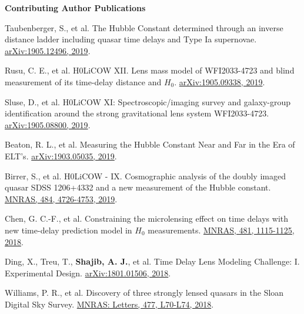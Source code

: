 \documentclass[margin, line]{res}
\begin{document}
\begin{resume}
\textbf{Contributing Author Publications} \\
\begin{etaremune}
	\item Taubenberger, S., et al. The Hubble Constant determined through an inverse distance ladder including quasar time delays and Type Ia supernovae. \href{https://arxiv.org/abs/1905.12496}{arXiv:1905.12496, 2019}.
	\item Rusu, C. E., et al. H0LiCOW XII. Lens mass model of WFI2033-4723 and blind measurement of its time-delay distance and $H_0$. \href{http://adsabs.harvard.edu/abs/2019arXiv190509338R}{arXiv:1905.09338, 2019}.
	\item Sluse, D., et al. H0LiCOW XI: Spectroscopic/imaging survey and galaxy-group identification around the strong gravitational lens system WFI2033-4723. \href{http://adsabs.harvard.edu/abs/2019arXiv190508800S}{arXiv:1905.08800, 2019}.
	\item Beaton, R. L., et al. Measuring the Hubble Constant Near and Far in the Era of ELT's. \href{https://arxiv.org/abs/1903.05035}{arXiv:1903.05035, 2019}.
	\item Birrer, S., et al. H0LiCOW - IX. Cosmographic analysis of the doubly imaged quasar SDSS 1206+4332 and a new measurement of the Hubble constant. \href{https://doi.org/10.1093/mnras/stz200}{MNRAS, 484, 4726-4753, 2019}.
	\item Chen, G. C.-F., et al. Constraining the microlensing effect on time delays with new time-delay prediction model in $H_0$ measurements. \href{https://doi.org/10.1093/mnras/sty2350}{MNRAS, 481, 1115-1125, 2018}.
	\item Ding, X., Treu, T., {\bf Shajib, A. J.}, et al. Time Delay Lens Modeling Challenge: I. Experimental Design. \href{https://arxiv.org/abs/1801.01506}{arXiv:1801.01506, 2018}.
 	\item Williams, P. R., et al. Discovery of three strongly lensed quasars in the Sloan Digital Sky Survey. \href{https://doi.org/10.1093/mnrasl/sly043}{MNRAS: Letters, 477, L70-L74, 2018}.
\end{etaremune}



\end{resume}
\end{document}
